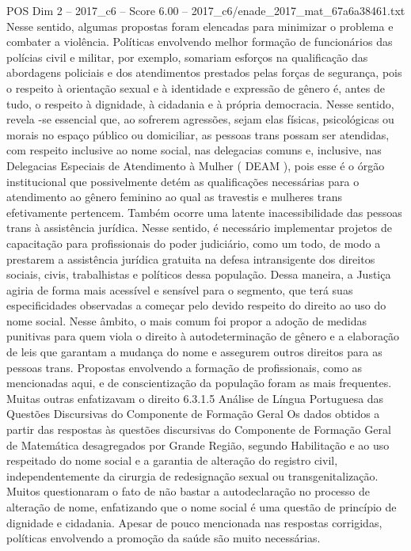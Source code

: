 \begin{textsample}{POS Dim 2 – 2017\_c6 – Score 6.00 – 2017\_c6/enade\_2017\_mat\_67a6a38461.txt}
Nesse sentido, algumas propostas foram elencadas para minimizar o problema e combater a violência.
Políticas envolvendo melhor formação de funcionários das polícias civil e militar, por exemplo, somariam esforços na qualificação das abordagens policiais e dos atendimentos prestados pelas forças de segurança, pois o respeito à orientação sexual e à identidade e expressão de gênero é, antes de tudo, o respeito à dignidade, à cidadania e à própria democracia.
Nesse sentido, revela -se essencial que, ao sofrerem agressões, sejam elas físicas, psicológicas ou morais no espaço público ou domiciliar, as pessoas trans possam ser atendidas, com respeito inclusive ao nome social, nas delegacias comuns e, inclusive, nas Delegacias Especiais de Atendimento à Mulher ( DEAM ), pois esse é o órgão institucional que possivelmente detém as qualificações necessárias para o atendimento ao gênero feminino ao qual as travestis e mulheres trans efetivamente pertencem.
Também ocorre uma latente inacessibilidade das pessoas trans à assistência jurídica.
Nesse sentido, é necessário implementar projetos de capacitação para profissionais do poder judiciário, como um todo, de modo a prestarem a assistência jurídica gratuita na defesa intransigente dos direitos sociais, civis, trabalhistas e políticos dessa população.
Dessa maneira, a Justiça agiria de forma mais acessível e sensível para o segmento, que terá suas especificidades observadas a começar pelo devido respeito do direito ao uso do nome social.
Nesse âmbito, o mais comum foi propor a adoção de medidas punitivas para quem viola o direito à autodeterminação de gênero e a elaboração de leis que garantam a mudança do nome e assegurem outros direitos para as pessoas trans.
Propostas envolvendo a formação de profissionais, como as mencionadas aqui, e de conscientização da população foram as mais frequentes.
Muitas outras enfatizavam o direito 6.3.1.5 Análise de Língua Portuguesa das Questões Discursivas do Componente de Formação Geral Os dados obtidos a partir das respostas às questões discursivas do Componente de Formação Geral de Matemática desagregados por Grande Região, segundo Habilitação e ao uso respeitado do nome social e a garantia de alteração do registro civil, independentemente da cirurgia de redesignação sexual ou transgenitalização.
Muitos questionaram o fato de não bastar a autodeclaração no processo de alteração de nome, enfatizando que o nome social é uma questão de princípio de dignidade e cidadania.
Apesar de pouco mencionada nas respostas corrigidas, políticas envolvendo a promoção da saúde são muito necessárias.

\end{textsample}
